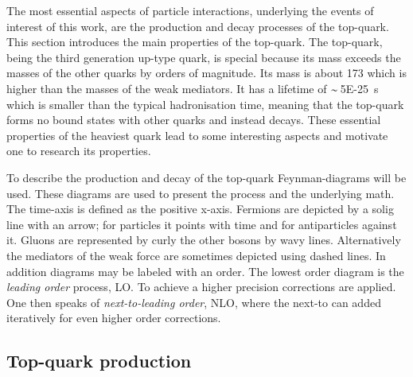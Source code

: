 The most essential aspects of particle interactions, underlying the events of interest of this work, are the production and decay processes of the top-quark. This section introduces the main properties of the top-quark. 
The top-quark, being the third generation up-type quark, is special because its mass exceeds the masses of the other quarks by orders of magnitude. Its mass is about \SI{173}{\GeVovercsq} which is higher than the masses of the weak mediators. 
It has a lifetime of $\sim\!$ \SI{5E-25}{\second} which is smaller than the typical hadronisation time, meaning that the top-quark forms no bound states with other quarks and instead decays.
These essential properties of the heaviest quark lead to some interesting aspects and motivate one to research its properties.

To describe the production and decay of the top-quark Feynman-diagrams will be used. These diagrams are used to present the process and the underlying math. The time-axis is defined as the positive x-axis. Fermions are depicted by a solig line with an arrow; for particles it points with time and for antiparticles against it. Gluons are represented by curly the other bosons by wavy lines. Alternatively the mediators of the weak force are sometimes depicted using dashed lines.
In addition diagrams may be labeled with an order. The lowest order diagram is the \emph{leading order} process, LO. To achieve a higher precision corrections are applied. One then speaks of \emph{next-to-leading order}, NLO, where the next-to can added iteratively for even higher order corrections.


\subsection{Top-quark production}

